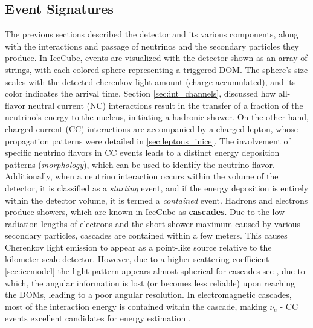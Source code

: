 \subsection{Event Signatures}
\label{sec:morphologies}
The previous sections described the detector and its various components, along with the interactions and passage of neutrinos and the secondary particles they produce. In IceCube, events are visualized with the detector shown as an array of strings, with each colored sphere representing a triggered DOM. The sphere's size scales with the detected cherenkov light amount (charge accumulated), and its color indicates the arrival time. Section \ref{sec:int_channels}, discussed how all-flavor neutral current (NC) interactions result in the transfer of a fraction of the neutrino's energy to the nucleus, initiating a hadronic shower. On the other hand, charged current (CC) interactions are accompanied by a charged lepton, whose propagation patterns were detailed in \ref{sec:leptons_inice}. The involvement of specific neutrino flavors in CC events leads to a distinct energy deposition patterns (\emph{morphology}), which can be used to identify the neutrino flavor. Additionally, when a neutrino interaction occurs within the volume of the detector, it is classified as a \emph{starting} event, and if the energy deposition is entirely within the detector volume, it is termed a \emph{contained} event.
Hadrons and electrons produce showers, which are known in IceCube as \textbf{cascades}. Due to the low radiation lengths of electrons and the short shower maximum caused by various secondary particles, cascades are contained within a few meters. This causes Cherenkov light emission to appear as a point-like source relative to the kilometer-scale detector. However, due to a higher scattering coefficient \ref{sec:icemodel} the light pattern appears almost spherical for cascades see , due to which, the angular information is lost (or becomes less reliable) upon reaching the DOMs, leading to a poor angular resolution. In electromagnetic cascades, most of the interaction energy is contained within the cascade, making $\nu_{e}$ - CC events excellent candidates for energy estimation .
